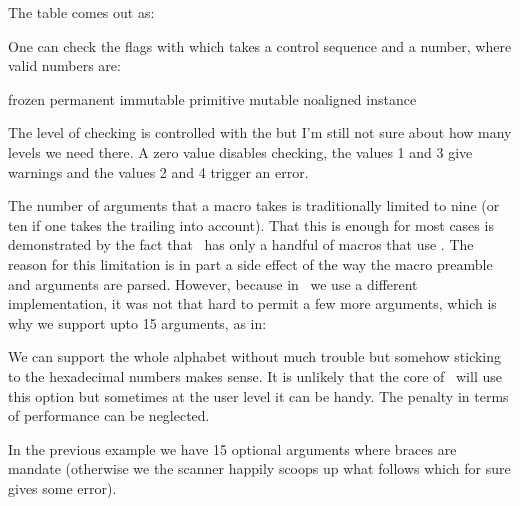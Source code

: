 The table comes out as:

\getbuffer[example]

One can check the flags with \type {\ifflags} which takes a control sequence and
a number, where valid numbers are:

\starttabulate[|r|lw(8em)|r|lw(8em)|r|lw(8em)|r|lw(8em)|]
\NC \the\frozenflagcode    \NC frozen
\NC \the\permanentflagcode \NC permanent
\NC \the\immutableflagcode \NC immutable
\NC \the\primitiveflagcode \NC primitive  \NC \NR
\NC \the\mutableflagcode   \NC mutable
\NC \the\noalignedflagcode \NC noaligned
\NC \the\instanceflagcode  \NC instance
\NC                        \NC            \NC \NR
\stoptabulate

The level of checking is controlled with the \type {\overloadmode} but I'm still
not sure about how many levels we need there. A zero value disables checking,
the values 1 and 3 give warnings and the values 2 and 4 trigger an error.

\stopsectionlevel

\startsectionlevel[title=Arguments]

The number of arguments that a macro takes is traditionally limited to nine (or
ten if one takes the trailing \type {#} into account). That this is enough for
most cases is demonstrated by the fact that \CONTEXT\ has only a handful of
macros that use . The reason for this limitation is in part a side
effect of the way the macro preamble and arguments are parsed. However, because
in \LUAMETATEX\ we use a different implementation, it was not that hard to permit
a few more arguments, which is why we support upto 15 arguments, as in:

\starttyping[option=TEX]
\stoptyping

We can support the whole alphabet without much trouble but somehow sticking to
the hexadecimal numbers makes sense. It is unlikely that the core of \CONTEXT\
will use this option but sometimes at the user level it can be handy. The penalty
in terms of performance can be neglected.

\starttyping[option=TEX]
\tolerant{}

\stoptyping

In the previous example we have 15 optional arguments where braces are mandate
(otherwise we the scanner happily scoops up what follows which for sure gives some
error).

